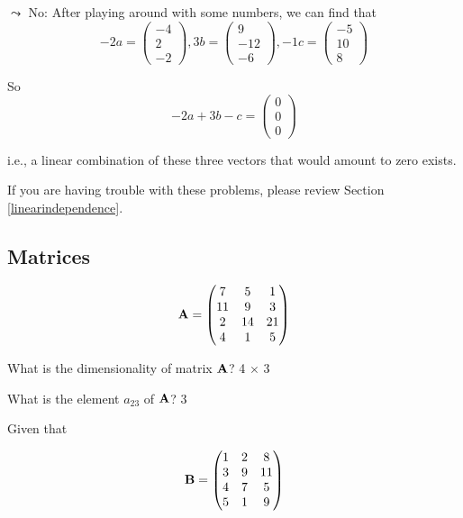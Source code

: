 \documentclass[
]{book}
\theoremstyle{definition}
\theoremstyle{definition}
\theoremstyle{definition}
\theoremstyle{definition}
\theoremstyle{remark}
\begin{document}
\(\leadsto\) No: After playing around with some numbers, we can find that
\[-2a = \begin{pmatrix} -4\\ 2\\ -2 \end{pmatrix}, 3b = \begin{pmatrix} 9\\ -12\\ -6 \end{pmatrix}, -1c = \begin{pmatrix} -5\\ 10\\ 8 \end{pmatrix}\]

So
\[-2a + 3b - c = \begin{pmatrix} 0 \\ 0 \\ 0 \end{pmatrix}\]

i.e., a linear combination of these three vectors that would amount to zero exists.

If you are having trouble with these problems, please review Section \ref{linearindependence}.

\hypertarget{matrices-1}{%
\subsection*{Matrices}\label{matrices-1}}

\[{\bf A}=\begin{pmatrix}
            7 & 5 & 1 \\
            11 & 9 & 3 \\ 
            2 & 14 & 21 \\ 
            4 & 1 & 5
        \end{pmatrix}\]

What is the dimensionality of matrix \({\bf A}\)? 4 \(\times\) 3

What is the element \(a_{23}\) of \({\bf A}\)? 3

Given that

\[{\bf B}=\begin{pmatrix}
            1 & 2 & 8 \\
            3 & 9 & 11 \\ 
            4 & 7 & 5 \\ 
            5 & 1 & 9
        \end{pmatrix}\]
\end{document}
